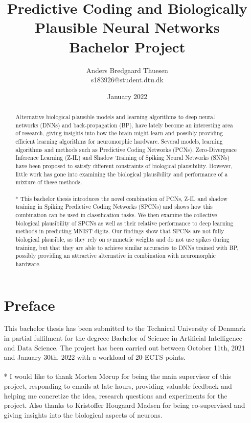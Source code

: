 \documentclass[a4paper,11pt]{article} %
\title{
  Predictive Coding and Biologically Plausible Neural Networks \\
  \large{Bachelor Project}
}
\author{Anders Bredgaard Thuesen \\ s183926@student.dtu.dk}
\date{January 2022}
\begin{document}
\maketitle
\thispagestyle{empty}

\newpage
\thispagestyle{empty}
\begin{abstract}  
Alternative biological plausible models and learning algorithms to deep neural networks (DNNs) and back-propagation (BP), have lately become an interesting area of research, giving insights into how the brain might learn and possibly providing efficient learning algorithms for neuromorphic hardware. Several models, learning algorithms and methods such as Predictive Coding Networks (PCNs), Zero-Divergence Inference Learning (Z-IL) and Shadow Training of Spiking Neural Networks (SNNs) have been proposed to satisfy different constraints of biological plausibility. However, little work has gone into examining the biological plausibility and performance of a mixture of these methods. \\
\\*
This bachelor thesis introduces the novel combination of PCNs, Z-IL and shadow training in Spiking Predictive Coding Networks (SPCNs) and shows how this combination can be used in classification tasks. We then examine the collective biological plausibility of SPCNs as well as their relative performance to deep learning methods in predicting MNIST digits. Our findings show that SPCNs are not fully biological plausible, as they rely on symmetric weights and do not use spikes during training, but that they are able to achieve similar accuracies to DNNs trained with BP, possibly providing an attractive alternative in combination with neuromorphic hardware.
\end{abstract}

\newpage 
\thispagestyle{empty}
\section*{Preface}
This bachelor thesis has been submitted to the Technical University of Denmark in partial fulfilment for the degreee Bachelor of Science in Artificial Intelligence and Data Science. The project has been carried out between  
October 11th, 2021 and January 30th, 2022 with a workload of 20 ECTS points. \\
\\*
I would like to thank Morten Mørup for being the main supervisor of this project, responding to emails at late hours, providing valuable feedback and helping me concretize the idea, research questions and experiments for the project. Also thanks to Kristoffer Hougaard Madsen for being co-supervised and giving insights into the biological aspects of neurons. 
\end{document}
